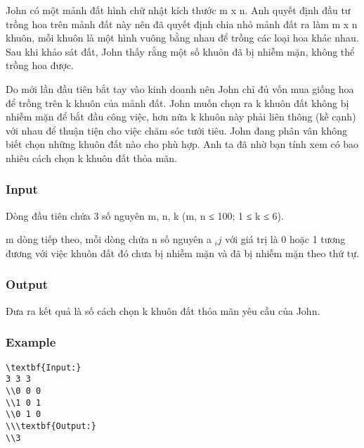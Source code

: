 



   John có một mảnh đất hình chữ nhật kích thước m x n. Anh quyết định đầu tư trồng hoa trên mảnh đất này nên đã quyết định chia nhỏ mảnh đất ra làm m x n khuôn, mỗi khuôn là một hình vuông bằng nhau để trồng các loại hoa khác nhau. Sau khi khảo sát đất, John thấy rằng một số khuôn đã bị nhiễm mặn, không thể trồng hoa được.  

   Do mới lần đầu tiên bắt tay vào kinh doanh nên John chỉ đủ vốn mua giống hoa để trồng trên k khuôn của mảnh đất. John muốn chọn ra k khuôn đất không bị nhiễm mặn để bắt đầu công việc, hơn nữa k khuôn này phải liên thông (kề cạnh) với nhau để thuận tiện cho việc chăm sóc tưới tiêu. John đang phân vân không biết chọn những khuôn đất nào cho phù hợp. Anh ta đã nhờ bạn tính xem có bao nhiêu cách chọn k khuôn đất thỏa mãn.  

\subsubsection{   Input  }

   Dòng đầu tiên chứa 3 số nguyên m, n, k (m, n ≤ 100; 1 ≤ k ≤ 6).  

   m dòng tiếp theo, mỗi dòng chứa n số nguyên a   $_    ij   $   với giá trị là 0 hoặc 1 tương đương với việc khuôn đất đó chưa bị nhiễm mặn và đã bị nhiễm mặn theo thứ tự.  

\subsubsection{   Output  }

   Đưa ra kết quả là số cách chọn k khuôn đất thỏa mãn yêu cầu của John.  

\subsubsection{   Example  }
\begin{verbatim}
\textbf{Input:}
3 3 3
\\0 0 0
\\1 0 1
\\0 1 0
\\\textbf{Output:}
\\3
\end{verbatim}